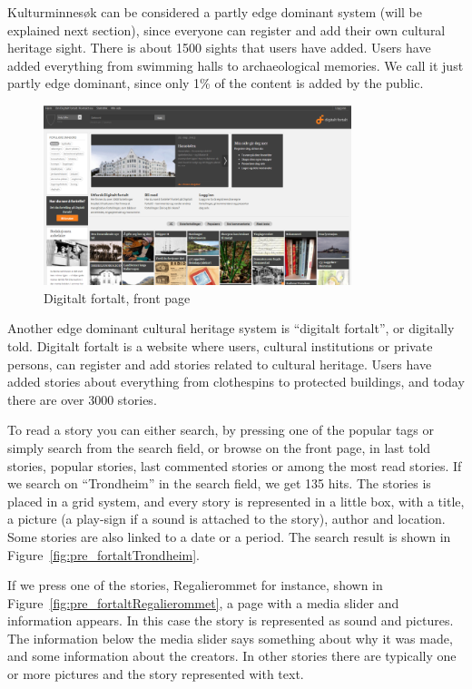 \documentclass[11pt]{book}
\begin{document}
Kulturminnesøk can be considered a partly edge dominant system (will be explained next section), since everyone can register and add their own cultural heritage sight. There is about 1500 sights that users have added. Users have added everything from swimming halls to archaeological memories. We call it just partly edge dominant, since only 1\% of the content is added by the public.

\begin{figure}[H]
      \centering
      \includegraphics[width=0.8\textwidth]{Figures/Prestudy/digitaltfortaltForside.png}
      \caption{Digitalt fortalt, front page}
      \label{fig:pre_fortaltFrontPage}
\end{figure}

Another edge dominant cultural heritage system is ``digitalt fortalt'', or digitally told. Digitalt fortalt is a website where users, cultural institutions or private persons, can register and add stories related to cultural heritage. Users have added stories about everything from clothespins to protected buildings, and today there are over 3000 stories. 

To read a story you can either search, by pressing one of the popular tags or simply search from the search field, or browse on the front page, in last told stories, popular stories, last commented stories or among the most  read stories. If we search on ``Trondheim'' in the search field, we get 135 hits. The stories is placed in a grid system, and every story is represented in a little box, with a title, a picture (a play-sign if a sound is attached to the story), author and location. Some stories are also linked to a date or a period. The search result is shown in Figure~\ref{fig:pre_fortaltTrondheim}.

If we press one of the stories, Regalierommet for instance, shown in Figure~\ref{fig:pre_fortaltRegalierommet}, a page with a media slider and information appears. In this case the story is represented as sound and pictures. The information below the media slider says something about why it was made, and some information about the creators. In other stories there are typically one or more pictures and the story represented with text.
\end{document}

